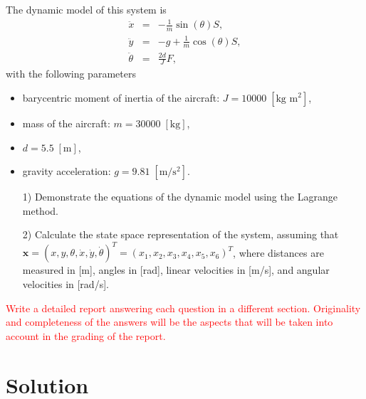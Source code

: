 \documentclass{article}
\begin{document}
\noindent
The dynamic model of this system is
\begin{eqnarray*}
\ddot{x}  &=&- \frac{1}{m}  \sin (\theta) S,\\
\ddot{y} &=&- g + \frac{1}{m} \cos ( \theta) S, \\
 \ddot{\theta} &=& \frac{2 d}{J}  F,
\end{eqnarray*}
with the following parameters 
\begin{itemize}
\item
barycentric moment of inertia of the aircraft: $J = 10 000 \; [\text{kg m}^2]$, 
\item
mass of the aircraft: $m = 30 000 \; [\text{kg}]$, 
\item
$d = 5.5 \; [\text{m}]$, 
\item
gravity acceleration: $g = 9.81 \; [\text{m}/\text{s}^2]$.
\end{itemize}


















\begin{itemize}

\item[1)] Demonstrate the equations of the dynamic model using the Lagrange method.

\item[2)] Calculate the state space representation of the system, assuming that $\mathbf{x} = (x, y, \theta, \dot{x}, \dot{y}, \dot{\theta})^T = ( x_1, x_2, x_3, x_4, x_5, x_6)^T$, where distances are measured in [m], angles in [rad], linear velocities in [m/s], and angular velocities in [rad/s].

\end{itemize}


\bigskip

\noindent
\textcolor{red}{Write a detailed report answering each question in a different section. Originality and completeness of the answers will be the aspects that will be taken into account in the grading of the report. 
} 


\section*{Solution}
\end{document}
